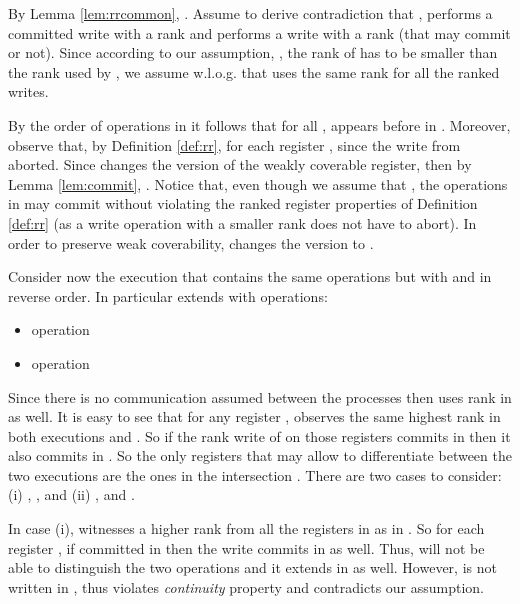 By Lemma \ref{lem:rrcommon}, .
Assume to derive contradiction that , 
	performs a committed write with a rank  and  performs a write 
	with a rank   (that may commit or not). 
Since according to our assumption, 
	, the rank of  has to be smaller than 
	the rank used by , we assume w.l.o.g. that  uses the same 
	rank  for all the ranked writes. 

	
By the order of operations in  it follows that for all , 
	 appears before 
	in . Moreover, observe that, by Definition \ref{def:rr}, for each register ,
	 since the write from  aborted. 
Since  changes 
	the version of the weakly coverable register, then by Lemma \ref{lem:commit}, . 
Notice that, even though we assume that , 
	the operations in  may commit
	without violating the ranked register properties of Definition \ref{def:rr} (as a write operation
	with a smaller rank does not have to abort). In order to preserve 
	weak coverability,  changes the version  to . 


	Consider now the execution  that contains the same 
	operations but with  and  in reverse order. 
	In particular  extends  with operations:
	\begin{itemize}
		\item operation 
		\item operation 
\end{itemize}  
Since there is no communication assumed between the processes then  uses 
rank  in  as well. It is easy to see that for any register ,
 observes the same highest rank  in both executions  and .
So if the rank write of  on those registers commits in  then it also commits in .
So the only registers that may allow  to differentiate between the two executions are the 
ones in the intersection . There are two cases to consider: (i) ,
, and (ii) , and . 


 In case (i),  witnesses
a higher rank from all the registers in  as in . So for each register ,
if  committed in  then the write commits in  as well.
Thus,  will not be able to distinguish the two operations and it extends  in 
 as well. However,  is not written in , thus  violates \emph{continuity}
property and contradicts our assumption. 


